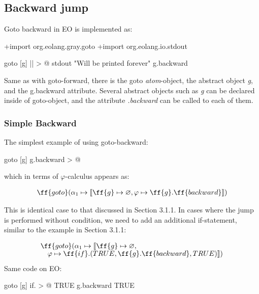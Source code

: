 \documentclass[sigplan,review,11pt,nonacm,natbib=false]{acmart}
\newcommand\br{\\[-4pt]}
\begin{document}
\subsection{Backward jump}
Goto backward in EO is implemented as:

\begin{ffcode}
+import org.eolang.gray.goto
+import org.eolang.io.stdout

goto
  [g]
    || > @
      stdout "Will be printed forever"
      g.backward
\end{ffcode}

Same as with goto-forward, there is the goto \emph{atom}-object, the abstract object \emph{g}, and the g.backward attribute. Several abstract objects such as \emph{g} can be declared inside of goto-object, and the attribute \emph{.backward} can be called to each of them.

\subsubsection{Simple Backward} The simplest example of using goto-backward:

\begin{ffcode}
goto
  [g]
    g.backward > @
\end{ffcode}

which in terms of $\varphi$-calculus appears as:

\begin{equation}
\begin{split}
& \ff{goto}(\alpha_1 \mapsto \llbracket \ff{g} \mapsto \varnothing, \varphi \mapsto \ff{g}.\ff{backward} \rrbracket ) \\
\end{split}
\end{equation}

This is identical case to that discussed in Section 3.1.1. In cases where the jump is performed without condition, we need to add an additional if-statement, similar to the example in Section 3.1.1:

\begin{equation}
\begin{split}
& \ff{goto}(\alpha_1 \mapsto \llbracket \ff{g} \mapsto \varnothing, \br
& \quad \varphi \mapsto \ff{if}.( TRUE, \ff{g}.\ff{backward}, TRUE ) \rrbracket) \br
\end{split}
\end{equation}

Same code on EO:

\begin{ffcode}
goto
  [g]
    if. > @
      TRUE
      g.backward
      TRUE
\end{ffcode}
\end{document}
